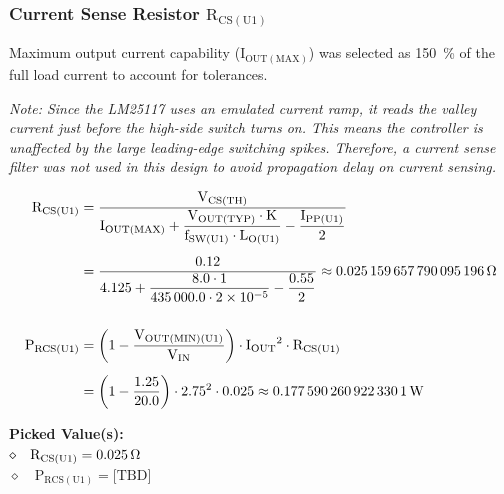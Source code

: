 \documentclass[11pt, a4paper]{article}
\begin{document}
\subsubsection{Current Sense Resistor \texorpdfstring{$\mathrm{R_{CS(U1)}}$}{RCS(U1)}}
Maximum output current capability ($\mathrm{I_{OUT(MAX)}}$) was selected as \qty{150}{\percent} of the full load current to account for tolerances. \\[1em]
{\small\itshape Note: Since the LM25117 uses an emulated current ramp, it reads the valley current just before the high-side switch turns on. This means the controller is unaffected by the large leading-edge switching spikes. 
Therefore, a current sense filter was not used in this design to avoid propagation delay on current sensing. \par}
\begin{align}
\mathrm{R_{CS(U1)}}  &= \frac{\mathrm{V_{CS(TH)}}}{\mathrm{I_{OUT(MAX)}} + \dfrac{\mathrm{V_{OUT(TYP)}} \cdot \mathrm{K}}{\mathrm{f_{SW(U1)}} \cdot \mathrm{L_{O(U1)}}} - \dfrac{\mathrm{I_{PP(U1)}}}{2}} \nonumber \\[0.5em]
                     &= \frac{0.12}{\num{4.125} + \dfrac{\num{8.0} \cdot 1}{\num{435000.0} \cdot \num{2e-05}} - \dfrac{\num{0.55}}{2}} \approx \qty{0.025159657790095196}{\ohm}\\[1.5em]
\mathrm{P_{RCS(U1)}} &= \left(1 - \frac{\mathrm{V_{OUT(MIN)(U1)}}}{\mathrm{V_{IN}}}\right) \cdot \mathrm{I_{OUT}}^2 \cdot \mathrm{R_{CS(U1)}} \nonumber \\[0.5em]
                     &= \left(1 - \frac{\num{1.25}}{\num{20.0}}\right) \cdot \num{2.75}^2 \cdot \num{0.025} \approx \qty{0.1775902609223301}{\watt}
\end{align}
\begin{pickedbox}
\small\textbf{Picked Value(s):}\\[0.5em]
$\diamond\quad \mathrm{R_{CS(U1)}} = \qty{0.025}{\ohm}$ \\[0.25em]
$\diamond\quad \mathrm{P_{RCS(U1)}} = \text{[TBD]}$  %
\end{pickedbox}
\end{document}
